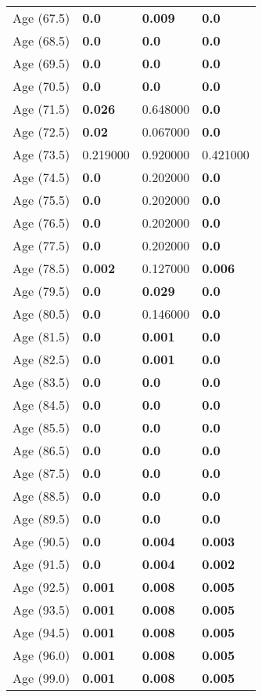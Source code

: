 \begin{tabular}{llll}
Age (67.5) & \textbf{0.0} & \textbf{0.009} & \textbf{0.0} \\
Age (68.5) & \textbf{0.0} & \textbf{0.0} & \textbf{0.0} \\
Age (69.5) & \textbf{0.0} & \textbf{0.0} & \textbf{0.0} \\
Age (70.5) & \textbf{0.0} & \textbf{0.0} & \textbf{0.0} \\
Age (71.5) & \textbf{0.026} & 0.648000 & \textbf{0.0} \\
Age (72.5) & \textbf{0.02} & 0.067000 & \textbf{0.0} \\
Age (73.5) & 0.219000 & 0.920000 & 0.421000 \\
Age (74.5) & \textbf{0.0} & 0.202000 & \textbf{0.0} \\
Age (75.5) & \textbf{0.0} & 0.202000 & \textbf{0.0} \\
Age (76.5) & \textbf{0.0} & 0.202000 & \textbf{0.0} \\
Age (77.5) & \textbf{0.0} & 0.202000 & \textbf{0.0} \\
Age (78.5) & \textbf{0.002} & 0.127000 & \textbf{0.006} \\
Age (79.5) & \textbf{0.0} & \textbf{0.029} & \textbf{0.0} \\
Age (80.5) & \textbf{0.0} & 0.146000 & \textbf{0.0} \\
Age (81.5) & \textbf{0.0} & \textbf{0.001} & \textbf{0.0} \\
Age (82.5) & \textbf{0.0} & \textbf{0.001} & \textbf{0.0} \\
Age (83.5) & \textbf{0.0} & \textbf{0.0} & \textbf{0.0} \\
Age (84.5) & \textbf{0.0} & \textbf{0.0} & \textbf{0.0} \\
Age (85.5) & \textbf{0.0} & \textbf{0.0} & \textbf{0.0} \\
Age (86.5) & \textbf{0.0} & \textbf{0.0} & \textbf{0.0} \\
Age (87.5) & \textbf{0.0} & \textbf{0.0} & \textbf{0.0} \\
Age (88.5) & \textbf{0.0} & \textbf{0.0} & \textbf{0.0} \\
Age (89.5) & \textbf{0.0} & \textbf{0.0} & \textbf{0.0} \\
Age (90.5) & \textbf{0.0} & \textbf{0.004} & \textbf{0.003} \\
Age (91.5) & \textbf{0.0} & \textbf{0.004} & \textbf{0.002} \\
Age (92.5) & \textbf{0.001} & \textbf{0.008} & \textbf{0.005} \\
Age (93.5) & \textbf{0.001} & \textbf{0.008} & \textbf{0.005} \\
Age (94.5) & \textbf{0.001} & \textbf{0.008} & \textbf{0.005} \\
Age (96.0) & \textbf{0.001} & \textbf{0.008} & \textbf{0.005} \\
Age (99.0) & \textbf{0.001} & \textbf{0.008} & \textbf{0.005} \\
\bottomrule
\end{tabular}
